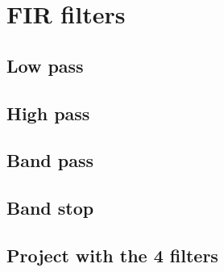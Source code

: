 \documentclass[12pt]{article}   	%
\begin{document}
\section{FIR filters}


\subsection{Low pass}



\subsection{High pass}



\subsection{Band pass}



\subsection{Band stop}



\subsection{Project with the 4 filters}
\end{document}
